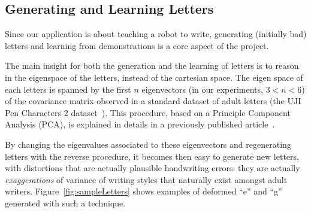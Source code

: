 \documentclass{article}
\begin{document}
\subsection{Generating and Learning Letters}

Since our application is about teaching a robot to write, generating (initially
bad) letters and learning from demonstrations is a core aspect of the project.

The main insight for both the generation and the learning of letters is to
reason in the eigenspace of the letters, instead of the cartesian space. The
eigen space of each letters is spanned by the first $n$ eigenvectors (in our
experiments, $3 < n < 6$) of the covariance matrix observed in a standard
dataset of adult letters (the UJI Pen Characters 2 dataset~\cite{Llorens2008}).
This procedure, based on a Principle Component Analysis (PCA), is explained in
details in a previously published article~\cite{hood2015when}.

By changing the eigenvalues associated to these eigenvectors and regenerating
letters with the reverse procedure, it becomes then easy to generate new
letters, with distortions that are actually plausible handwriting errors: they
are actually \emph{exaggerations} of variance of writing styles that naturally
exist amongst adult writers.  Figure~\ref{fig:sampleLetters} shows examples of
deformed ``e'' and ``g'' generated with such a technique.
\end{document}
